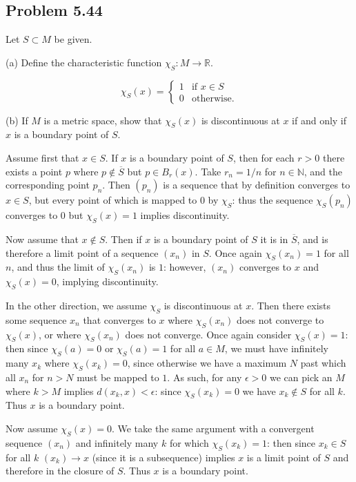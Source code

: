 \documentclass{amsart}
\begin{document}
\newpage

\subsection*{Problem 5.44} Let \( S \subset M \) be given.

(a) Define the characteristic function \( \chi_S : M \to \mathbb{R} \).

\medskip \noindent \[\chi_S(x)=\begin{cases}
    1 & \text{if } x\in S\\
    0 & \text{otherwise.}
\end{cases}
\]

(b) If \( M \) is a metric space, show that \( \chi_S(x) \) is discontinuous at \( x \) if and only if \( x \) is a boundary point of \( S \).

\medskip \noindent Assume first that $x\in S$. If $x$ is a boundary point of $S$, then for each $r>0$ there exists a point $p$
where $p\notin \overline{S}$ but $p\in B_r(x)$. Take $r_n = 1/n$ for $n\in \mathbb{N}$, and the corresponding point
$p_n$. Then $(p_n)$ is a sequence that by definition converges to $x\in S$, but every point of which is mapped
to $0$ by $\chi_S$: thus the sequence $\chi_S(p_n)$ converges to $0$ but $\chi_S(x)=1$ implies discontinuity.

\medskip \noindent Now assume that $x\notin S$. Then if $x$ is a boundary point of $S$ it is in $\overline{S}$, and
is therefore a limit point of a sequence $(x_n)$ in $S$. Once again $\chi_S(x_n)=1$ for all $n$, and
thus the limit of $\chi_S(x_n)$ is $1$: however, $(x_n)$ converges to $x$ and $\chi_S(x)=0$, implying discontinuity.

\medskip \noindent In the other direction, we assume $\chi_S$ is discontinuous at $x$. Then there exists
some sequence $x_n$ that converges to $x$ where $\chi_S(x_n)$ does not converge to $\chi_S(x)$, or where $\chi_S(x_n)$
does not converge. Once again consider $\chi_S(x)=1$: then since $\chi_S(a)=0$ or $\chi_S(a)=1$ for all
$a\in M$, we must have infinitely many $x_k$ where $\chi_S(x_k)=0$, since otherwise we have a maximum $N$ past which
all $x_n$ for $n>N$ must be mapped to $1$. As such, for any $\epsilon>0$ we can pick an $M$ where 
$k>M$ implies $d(x_k, x)<\epsilon$: since $\chi_S(x_k)=0$ we have $x_k\notin S$ for all $k$. Thus $x$ is a boundary point.

\medskip \noindent Now assume $\chi_S(x)=0$. We take the same argument with a convergent sequence $(x_n)$ and infinitely many $k$ for which
$\chi_S(x_k)=1$: then since $x_k\in S$ for all $k$ $(x_k)\to x$ (since it is a subsequence) implies $x$ is a limit point of $S$ and therefore in
the closure of $S$. Thus $x$ is a boundary point.
\end{document}
